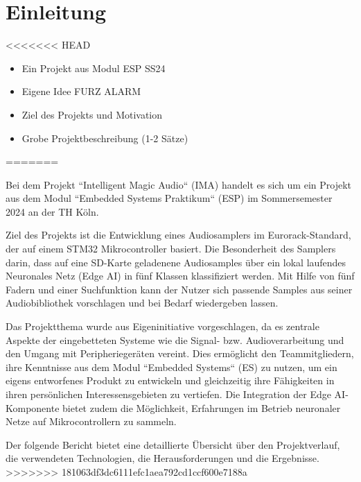 \newpage
\section{Einleitung}
<<<<<<< HEAD
\begin{itemize}
    \item Ein Projekt aus Modul ESP SS24
    \item Eigene Idee FURZ ALARM
    \item Ziel des Projekts und Motivation
    \item Grobe Projektbeschreibung (1-2 Sätze)
\end{itemize}
    
=======

Bei dem Projekt ``Intelligent Magic Audio`` (IMA) handelt es sich um ein Projekt aus dem Modul ``Embedded Systems Praktikum`` (ESP) im Sommersemester 2024 an der TH Köln.

Ziel des Projekts ist die Entwicklung eines Audiosamplers im Eurorack-Standard, der auf einem STM32 Mikrocontroller basiert. Die Besonderheit des Samplers darin, dass auf eine SD-Karte geladenene Audiosamples über ein lokal laufendes Neuronales Netz (Edge AI) in fünf Klassen klassifiziert werden. Mit Hilfe von fünf Fadern und einer Suchfunktion kann der Nutzer sich passende Samples aus seiner Audiobibliothek vorschlagen und bei Bedarf wiedergeben lassen. 

Das Projektthema wurde aus Eigeninitiative vorgeschlagen, da es zentrale Aspekte der eingebetteten Systeme wie die Signal- bzw. Audioverarbeitung und den Umgang mit Peripheriegeräten vereint. Dies ermöglicht den Teammitgliedern, ihre Kenntnisse aus dem Modul ``Embedded Systems`` (ES) zu nutzen, um ein eigens entworfenes Produkt zu entwickeln und gleichzeitig ihre Fähigkeiten in ihren persönlichen Interessensgebieten zu vertiefen. Die Integration der Edge AI-Komponente bietet zudem die Möglichkeit, Erfahrungen im Betrieb neuronaler Netze auf Mikrocontrollern zu sammeln.

Der folgende Bericht bietet eine detaillierte Übersicht über den Projektverlauf, die verwendeten Technologien, die Herausforderungen und die Ergebnisse.
>>>>>>> 181063df3dc6111efc1aea792cd1ccf600e7188a
